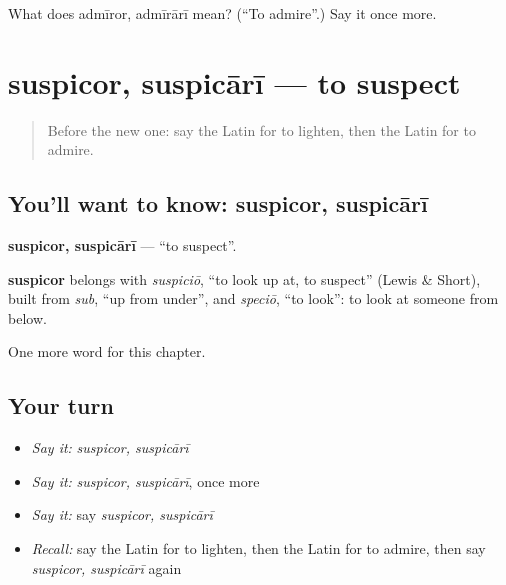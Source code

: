 \begin{tcolorbox}[breakable,colback=teal!4,colframe=teal!35!black,title={Before you move on}]
What does admīror, admīrārī mean? (\textquotedblleft{}To admire\textquotedblright{}.) Say it once more.
\end{tcolorbox}
\section[suspicor, suspicārī]{suspicor, suspicārī — to suspect}

\label{lesson:LA-C170-suspicor}



\begin{quote}
Before the new one: say the Latin for to lighten, then the Latin for to admire.
\end{quote}

\subsection*{You'll want to know: suspicor, suspicārī}
\textbf{suspicor, suspicārī} — \textquotedblleft{}to suspect\textquotedblright{}.

\begin{cousinweb}
\textbf{suspicor} belongs with \emph{suspiciō}, \textquotedblleft{}to look up at, to suspect\textquotedblright{} (Lewis \& Short), built from \emph{sub}, \textquotedblleft{}up from under\textquotedblright{}, and \emph{speciō}, \textquotedblleft{}to look\textquotedblright{}: to look at someone from below.
\end{cousinweb}

\begin{grammarlens}[title={What you've built}]
One more word for this chapter.
\end{grammarlens}

\subsection*{Your turn}
\begin{itemize}
\raggedright
  \item \emph{Say it:} \emph{suspicor, suspicārī}
  \item \emph{Say it:} \emph{suspicor, suspicārī}, once more
  \item \emph{Say it:} say \emph{suspicor, suspicārī}
  \item \emph{Recall:} say the Latin for to lighten, then the Latin for to admire, then say \emph{suspicor, suspicārī} again
\end{itemize}

